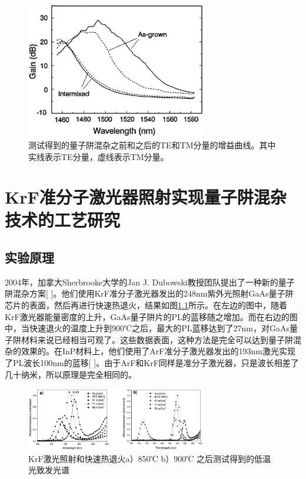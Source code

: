 \documentclass{ZJUthesis}
\begin{document}
\begin{figure}[!t]
    \centering
    \includegraphics[width=0.7\textwidth]{./Pictures/amplifier.eps}
    \caption{测试得到的量子阱混杂之前和之后的TE和TM分量的增益曲线。其中实线表示TE分量，虚线表示TM分量。}
    \label{fig_amplifier}
\end{figure}

\chapter{KrF准分子激光器照射实现量子阱混杂技术的工艺研究}

\section{实验原理}

2004年，加拿大Sherbrooke大学的Jan J. Dubowski教授团队提出了一种新的量子阱混杂方案[ ]。他们使用KrF准分子激光器发出的248nm紫外光照射GaAs量子阱芯片的表面，然后再进行快速热退火，结果如图\ref{fig_sherbrooke}所示。在左边的图中，随着KrF激光器能量密度的上升，GaAs量子阱片的PL的蓝移随之增加。而在右边的图中，当快速退火的温度上升到900℃之后，最大的PL蓝移达到了27nm，对GaAs量子阱材料来说已经相当可观了。这些数据表面，这种方法是完全可以达到量子阱混杂的效果的。在InP材料上，他们使用了ArF准分子激光器发出的193nm激光实现了PL波长100nm的蓝移[ ]。由于ArF和KrF同样是准分子激光器，只是波长相差了几十纳米，所以原理是完全相同的。

\begin{figure}[!t]
    \centering
    \includegraphics[width=0.7\textwidth]{./Pictures/sherbrooke.eps}
    \caption{KrF激光照射和快速热退火a）850℃ b）900℃ 之后测试得到的低温光致发光谱}
    \label{fig_sherbrooke}
\end{figure}
\end{document}
